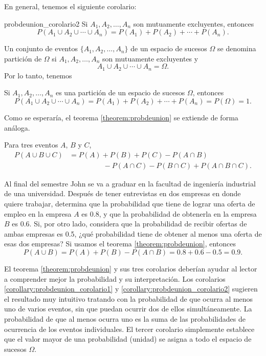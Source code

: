 En general, tenemos el siguiente corolario:

\begin{corollary}{}{probdeunion_corolario2}
    Si $A_1, A_2, \dots, A_n$ son mutuamente excluyentes, entonces
    $$P(A_1 \cup A_2 \cup \cdots \cup A_n) = P(A_1) + P(A_2) + \cdots + P(A_n).$$
\end{corollary}

Un conjunto de eventos $\{A_1, A_2, \dots, A_n\}$ de un espacio de sucesos $\Omega$ se denomina partición de $\Omega$ si $A_1, A_2, \dots, A_n$ son mutuamente excluyentes y
$$A_1 \cup A_2 \cup \cdots \cup A_n = \Omega.$$
Por lo tanto, tenemos

\begin{corollary}{}{}
    Si $A_1, A_2, \dots, A_n$ es una partición de un espacio de sucesos $\Omega$, entonces
    $$P(A_1 \cup A_2 \cup \cdots \cup A_n) = P(A_1) + P(A_2) + \cdots + P(A_n) = P(\Omega) = 1.$$
\end{corollary}

Como se esperaría, el teorema \ref{theorem:probdeunion} se extiende de forma análoga.

\begin{theorem}{}{}
    Para tres eventos $A$, $B$ y $C$,
    \begin{align*}
        P(A \cup B \cup C) & = P(A) + P(B) + P(C) - P(A \cap B) \\
        & \hspace{2cm} - P(A \cap C) - P(B \cap C) + P(A \cap B \cap C).
    \end{align*}
\end{theorem}

\newpage

\begin{examplebox}{}{}
    Al final del semestre John se va a graduar en la facultad de ingeniería industrial de una universidad. Después de tener entrevistas en dos empresas en donde quiere trabajar, determina que la probabilidad que tiene de lograr una oferta de empleo en la empresa $A$ es 0.8, y que la probabilidad de obtenerla en la empresa $B$ es 0.6. Si, por otro lado, considera que la probabilidad de recibir ofertas de ambas empresas es 0.5, ¿qué probabilidad tiene de obtener al menos una oferta de esas dos empresas?
    \tcblower
    \solucion Si usamos el teorema \ref{theorem:probdeunion}, entonces
    $$P(A \cup B) = P(A) + P(B) - P(A \cap B) = 0.8 + 0.6 - 0.5 = 0.9 .$$
\end{examplebox}

El teorema \ref{theorem:probdeunion} y sus tres corolarios deberían ayudar al lector a comprender mejor la probabilidad y su interpretación. Los corolarios \ref{corollary:probdeunion_corolario1} y \ref{corollary:probdeunion_corolario2} sugieren el resultado muy intuitivo tratando con la probabilidad de que ocurra al menos uno de varios eventos, sin que puedan ocurrir dos de ellos simultáneamente. La probabilidad de que al menos ocurra uno es la suma de las probabilidades de ocurrencia de los eventos individuales. El tercer corolario simplemente establece que el valor mayor de una probabilidad (unidad) se asigna a todo el espacio de sucesos $\Omega$.


